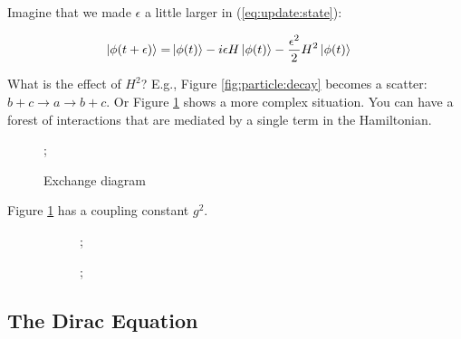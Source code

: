 \documentclass[]{article}
\begin{document}
Imagine that we made $\epsilon$ a little larger in (\ref{eq:update:state}):

\begin{align*}
\ket{\phi(t+\epsilon)} =& \ket{\phi(t)} -i \epsilon H \ket{\phi(t)} - \frac{\epsilon^2}{2} H^2 \ket{\phi(t)}
\end{align*}

What is the effect of $H^2$? E.g., Figure \ref{fig:particle:decay} becomes a scatter: $b+c \rightarrow a \rightarrow b + c$. Or Figure \ref{fig:scatter:annihilate} shows a more complex situation. You can have a forest of interactions that are mediated by a single term in the Hamiltonian.

\begin{figure}[H]
	\begin{center}
		\caption{Exchange diagram}\label{fig:scatter:annihilate}
		;
	\end{center}
\end{figure}

Figure \ref{fig:scatter:annihilate} has a coupling constant $g^2$.


\begin{figure}[H]
	\caption[Scatter electron and emit photon(field $A$):$A\Psi^+_e\Psi^-_e$]{Scatter electron and emit photon(field $A$):$A\Psi^+_e\Psi^-_e$. Sometimes what you thought was an electron behaves like an electron + photon. Low probability: think of as correction to electron, not a new process. If we look, we will screw up electron! Superposition.}
	\begin{center}
		\begin{subfigure}{0.45\textwidth}
		;
		\end{subfigure}
		\begin{subfigure}{0.45\textwidth}
			;
		\end{subfigure}
	\end{center}
\end{figure}

\subsection{The Dirac Equation}
\end{document}
